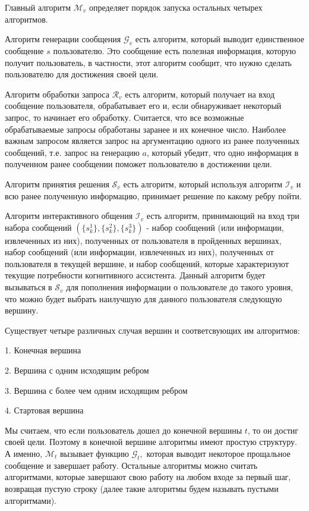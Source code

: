 \documentclass[12pt]{article}
\begin{document}
Главный алгоритм $\mathcal{M}_v$ определяет порядок запуска остальных четырех алгоритмов.

Алгоритм генерации сообщения $\mathcal{G}_v$ есть алгоритм, который выводит единственное сообщение $s$ пользователю. Это сообщение есть полезная информация, которую получит пользователь, в частности, этот алгоритм сообщит, что нужно сделать пользователю для достижения своей цели.

Алгоритм обработки запроса $\mathcal{R}_v$ есть алгоритм, который получает на вход сообщение пользователя, обрабатывает его и, если обнаруживает некоторый запрос, то начинает его обработку. Считается, что все возможные обрабатываемые запросы обработаны заранее и их конечное число. Наиболее важным запросом является запрос на аргументацию одного из ранее полученных сообщений, т.е. запрос на генерацию $a$, который убедит, что одно информация в полученном ранее сообщении поможет пользователю в достижении цели.

Алгоритм принятия решения $\mathcal{S}_v$ есть алгоритм, который используя алгоритм $\mathcal{I}_v$ и всю ранее полученную информацию, принимает решение по какому ребру пойти.

Алгоритм интерактивного общения $\mathcal{I}_v$ есть алгоритм, принимающий на вход три набора сообщений $(\{s_k^1\}, \{s_k^2\}, \{s_k^3\})$ - набор сообщений (или информации, извлеченных из них), полученных от пользователя в пройденных вершинах, набор сообщений (или информации, извлеченных из них), полученных от пользователя в текущей вершине, и набор сообщений, которые характеризуют текущие потребности когнитивного ассистента. Данный алгоритм будет вызываться в $\mathcal{S}_v$ для пополнения информации о пользователе до такого уровня, что можно будет выбрать наилучшую для данного пользователя следующую вершину.

Существует четыре различных случая вершин и соответсвующих им алгоритмов:

1. Конечная вершина

2. Вершина с одним исходящим ребром

3. Вершина с более чем одним исходящим ребром

4. Стартовая вершина

Мы считаем, что если пользователь дошел до конечной вершины $t$, то он достиг своей цели. Поэтому в конечной вершине алгоритмы имеют простую структуру. А именно, $\mathcal{M}_t$ вызывает функцию $\mathcal{G}_t,$ которая выводит некоторое прощальное сообщение и завершает работу. Остальные алгоритмы можно считать алгоритмами, которые завершают свою работу на любом входе за первый шаг, возвращая пустую строку (далее такие алгоритмы будем называть пустыми алгоритмами).
\end{document}
